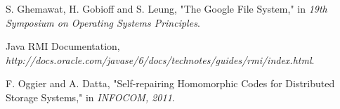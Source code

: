 \documentclass[conference]{IEEEtran}
\begin{document}















%
%
%
\begin{thebibliography}{1}

S. Ghemawat, H. Gobioff and S. Leung, "The Google File System," in {\em 19th Symposium on Operating Systems Principles}.


Java RMI Documentation,\\ {\em http://docs.oracle.com/javase/6/docs/technotes/guides/rmi/index.html}.


F. Oggier and A. Datta, "Self-repairing Homomorphic Codes for Distributed Storage Systems," in {\em INFOCOM, 2011}.

\end{thebibliography}




\end{document}
